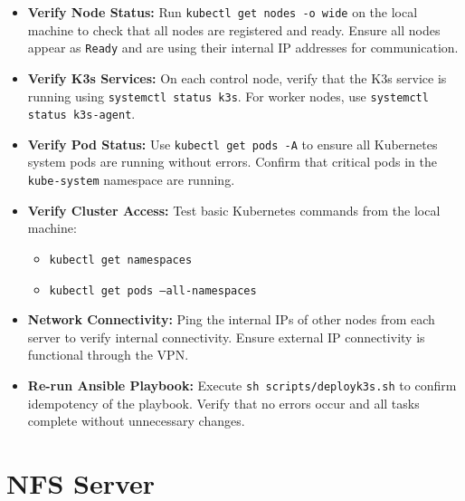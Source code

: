 \begin{itemize}
    \item \textbf{Verify Node Status:} Run \texttt{kubectl get nodes -o wide} on the local machine to check that all nodes are registered and ready. Ensure all nodes appear as \texttt{Ready} and are using their internal IP addresses for communication.
    
    \item \textbf{Verify K3s Services:} On each control node, verify that the K3s service is running using \texttt{systemctl status k3s}. For worker nodes, use \texttt{systemctl status k3s-agent}.
    
    \item \textbf{Verify Pod Status:} Use \texttt{kubectl get pods -A} to ensure all Kubernetes system pods are running without errors. Confirm that critical pods in the \texttt{kube-system} namespace are running.
    
    \item \textbf{Verify Cluster Access:} Test basic Kubernetes commands from the local machine:
    \begin{itemize}
        \item \texttt{kubectl get namespaces}
        \item \texttt{kubectl get pods --all-namespaces}
    \end{itemize}
    
    \item \textbf{Network Connectivity:} Ping the internal IPs of other nodes from each server to verify internal connectivity. Ensure external IP connectivity is functional through the VPN.
    
    \item \textbf{Re-run Ansible Playbook:} Execute \texttt{sh scripts/deploy\textunderscore k3s.sh} to confirm idempotency of the playbook. Verify that no errors occur and all tasks complete without unnecessary changes.
\end{itemize}

\section{NFS Server}

